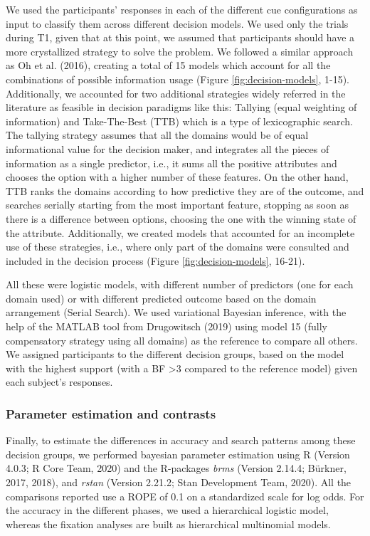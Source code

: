 \documentclass[
  english,
  man]{apa6}
\begin{document}
We used the participants' responses in each of the different cue configurations as input to classify them across different decision models. We used only the trials during T1, given that at this point, we assumed that participants should have a more crystallized strategy to solve the problem. We followed a similar approach as Oh et al. (2016), creating a total of 15 models which account for all the combinations of possible information usage (Figure \ref{fig:decision-models}, 1-15). Additionally, we accounted for two additional strategies widely referred in the literature as feasible in decision paradigms like this: Tallying (equal weighting of information) and Take-The-Best (TTB) which is a type of lexicographic search. The tallying strategy assumes that all the domains would be of equal informational value for the decision maker, and integrates all the pieces of information as a single predictor, i.e., it sums all the positive attributes and chooses the option with a higher number of these features. On the other hand, TTB ranks the domains according to how predictive they are of the outcome, and searches serially starting from the most important feature, stopping as soon as there is a difference between options, choosing the one with the winning state of the attribute. Additionally, we created models that accounted for an incomplete use of these strategies, i.e., where only part of the domains were consulted and included in the decision process (Figure \ref{fig:decision-models}, 16-21).

All these were logistic models, with different number of predictors (one for each domain used) or with different predicted outcome based on the domain arrangement (Serial Search). We used variational Bayesian inference, with the help of the MATLAB tool from Drugowitsch (2019) using model 15 (fully compensatory strategy using all domains) as the reference to compare all others. We assigned participants to the different decision groups, based on the model with the highest support (with a BF \textgreater3 compared to the reference model) given each subject's responses.

\hypertarget{parameter-estimation-and-contrasts}{%
\subsubsection{Parameter estimation and contrasts}\label{parameter-estimation-and-contrasts}}

Finally, to estimate the differences in accuracy and search patterns among these decision groups, we performed bayesian parameter estimation using R (Version 4.0.3; R Core Team, 2020) and the R-packages \emph{brms} (Version 2.14.4; Bürkner, 2017, 2018), and \emph{rstan} (Version 2.21.2; Stan Development Team, 2020). All the comparisons reported use a ROPE of 0.1 on a standardized scale for log odds. For the accuracy in the different phases, we used a hierarchical logistic model, whereas the fixation analyses are built as hierarchical multinomial models.
\end{document}
